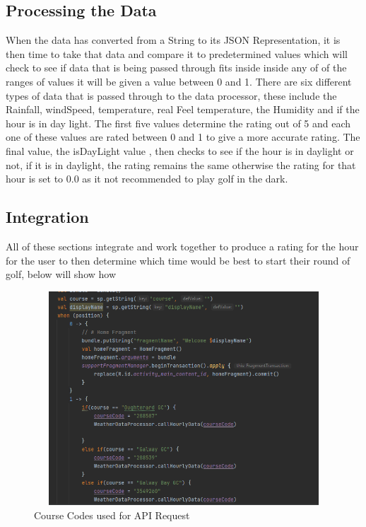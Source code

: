 \subsection {Processing the Data}
When the data has converted from a String to its JSON Representation, it is then time to take that data and compare it to predetermined values which will check to see if data that is being passed through fits inside inside any of of the ranges of values it will be given a value between 0 and 1.
\newline
\newline
There are six different types of data that is passed through to the data processor, these include the Rainfall, windSpeed, temperature, real Feel temperature, the Humidity and if the hour is in day light. The first five values determine the rating out of 5 and each one of these values are rated between 0 and 1 to give a more accurate rating. The final value, the isDayLight value , then checks to see if the hour is in daylight or not, if it is in daylight, the rating remains the same otherwise the rating for that hour is set to 0.0 as it not recommended to play golf in the dark.
\subsection{Integration}
All of these sections integrate and work together to produce a rating for the hour for the user to then determine which time would be best to start their round of golf, below will show how
\begin{figure}[H]
    \centering
    \includegraphics[width=12cm,height = 8cm]{img/CourseCodes.PNG}
    \caption{Course Codes used for API Request}
    \label{fig:altas config}
\end{figure}

